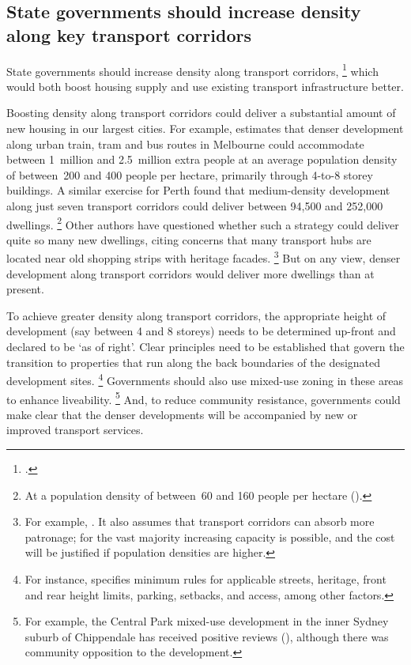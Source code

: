 \subsection{State governments should increase density along key transport corridors}\label{subsec:states-should-increase-density-along-key-transport-corridors}

State governments should increase density along transport corridors,%
	\footcites{Adams-2010-Transforming-Aust-cities}{IA_2018_Future_cities}
which would both boost housing supply and use existing transport infrastructure better.

Boosting density along transport corridors could deliver a substantial amount of new housing in our largest cities.
For example, \textcite{Adams-2010-Transforming-Aust-cities} estimates that denser development along urban train, tram and bus routes in Melbourne could accommodate between 1~million and 2.5~million extra people at an average population density of between~200 and 400 people per hectare, primarily through 4-to-8 storey buildings.
A similar exercise for Perth found that medium-density development along just seven transport corridors could deliver between 94,500 and 252,000 dwellings.%
	\footnote{At a population density of between~60 and 160 people per hectare (\textcite{PropertyCouncil-etal-2013-Transforming-Perth}).}
Other authors have questioned whether such a strategy could deliver quite so many new dwellings, citing concerns that many transport hubs are located near old shopping strips with heritage facades.%
	\footnote{For example, \textcite[][12]{BuxtonEtAl2015}.
	It also assumes that transport corridors can absorb more patronage; for the vast majority increasing capacity is possible, and the cost will be justified if population densities are higher.}
But on any view, denser development along transport corridors would deliver more dwellings than at present.

To achieve greater density along transport corridors, the appropriate height of development (say between 4 and 8 storeys) needs to be determined up-front and declared to be `as of right'.
Clear principles need to be established that govern the transition to properties that run along the back boundaries of the designated development sites.%
	\footnote{For instance, \textcite{Adams-2010-Transforming-Aust-cities} specifies minimum rules for applicable streets, heritage, front and rear height limits, parking, setbacks, and access, among other factors.}
Governments should also use mixed-use zoning in these areas to enhance liveability.%
  \footnote{For example, the Central Park mixed-use development in the inner Sydney suburb of Chippendale has received positive reviews (\textcite{williams2016centralpark}), although there was community opposition to the development.}
And, to reduce community resistance, governments could make clear that the denser developments will be accompanied by new or improved transport services.

